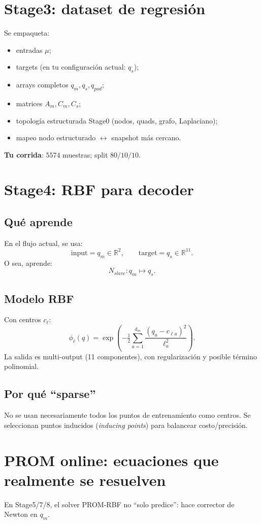 \documentclass[11pt,a4paper]{article}
\begin{document}
\section{Stage3: dataset de regresión}
Se empaqueta:
\begin{itemize}[leftmargin=1.5em]
\item entradas $\mu$;
\item targets (en tu configuración actual: $q_s$);
\item arrays completos $q_m,q_s,q_{pod}$;
\item matrices $A_m,C_m,C_s$;
\item topología estructurada Stage0 (nodos, quads, grafo, Laplaciano);
\item mapeo nodo estructurado $\leftrightarrow$ snapshot más cercano.
\end{itemize}

\textbf{Tu corrida}: $5574$ muestras; split $80/10/10$.

\section{Stage4: RBF para decoder}
\subsection{Qué aprende}
En el flujo actual, se usa:
\[
\text{input} = q_m \in \mathbb{R}^{2},
\qquad
\text{target} = q_s \in \mathbb{R}^{11}.
\]
O sea, aprende:
\[
N_{slave}: q_m \mapsto q_s.
\]

\subsection{Modelo RBF}
Con centros $c_\ell$:
\[
\phi_\ell(q)=\exp\!\left(-\tfrac12\sum_{a=1}^{d_m}\frac{(q_a-c_{\ell a})^2}{\ell_a^2}\right).
\]
La salida es multi-output (11 componentes), con regularización y posible término polinomial.

\subsection{Por qué ``sparse''}
No se usan necesariamente todos los puntos de entrenamiento como centros.
Se seleccionan puntos inducidos (\textit{inducing points}) para balancear costo/precisión.

\section{PROM online: ecuaciones que realmente se resuelven}
En Stage5/7/8, el solver PROM-RBF no ``solo predice'': hace corrector de Newton en $q_m$.
\end{document}
